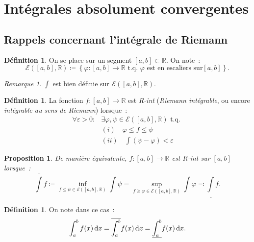 \documentclass{report}
\newtheorem{prp}[thm]{Proposition}
\theoremstyle{definition}
\newtheorem{déf}[thm]{Définition}
\theoremstyle{remark}
\newtheorem*{rmq}{Remarque}
\numberwithin{equation}{section}
\newcommand{\R}{\mathbb R}
\newcommand{\tq}{\text{ t.q. }}
\newcommand{\El}[2]{\mathcal E\!\left(#1, #2\right)}
\begin{document}
	\section{Intégrales absolument convergentes}
		\subsection{Rappels concernant l'intégrale de Riemann}
			\begin{déf} On se place sur un segment $[a, b] \subset \R$. On note~:
			\begin{equation}
				\El {[a, b]}\R \coloneqq \left\{\varphi : [a, b] \to \R \tq \varphi \text{ est en escaliers sur} [a, b]\right\}.
			\end{equation}
			\end{déf}

			\begin{rmq} $\int$ est bien définie sur $\El {[a, b]}\R$.
			\end{rmq}

			\begin{déf} La fonction $f : [a, b] \to \R$ est \textit{R-int} (\textit{Riemann intégrable}, ou encore \textit{intégrable au sens de Riemann})
			lorsque~:
			\begin{align}
				\forall \varepsilon > 0 : &\exists \varphi, \psi \in \El {[a, b]}\R \tq \\
				&(i) \quad \varphi \leq f \leq \psi \\
				&(ii) \quad \int(\psi-\varphi) < \varepsilon
			\end{align}
			\end{déf}

			\begin{prp} De manière équivalente, $f : [a, b] \to \R$ est R-int sur $[a, b]$ lorsque~:
			\begin{equation}
				\overline \int f \coloneqq \inf_{f \leq \psi \in \El {[a, b]}\R}\int \psi
				= \sup_{f \geq \varphi \in \El {[a, b]}\R}\int \varphi \eqqcolon \underline \int f.
			\end{equation}
			\end{prp}

			\begin{déf} On note dans ce cas~:
			\begin{equation}
				\int_a^b f(x)\dif x = \overline {\int_a^b} f(x)\dif x = \underline {\int_a^b} f(x)\dif x.
			\end{equation}
			\end{déf}
\end{document}
